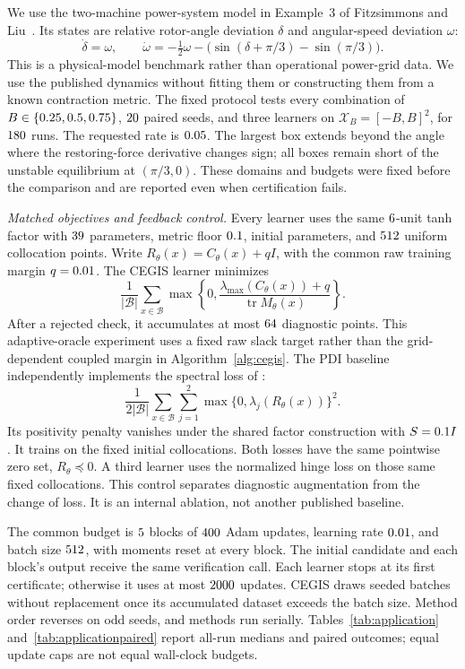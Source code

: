 \documentclass[12pt,onecolumn,journal]{IEEEtran}
\newcommand{\X}{\mathcal{X}}
\newcommand{\lmax}{\lambda_{\max}}
\providecommand{\tr}{}
\renewcommand{\tr}{\operatorname{tr}}
\begin{document}
We use the two-machine power-system model in Example~3 of Fitzsimmons and Liu~\cite{fitzsimmons2024}. Its states are relative rotor-angle deviation $\delta$ and angular-speed deviation $\omega$:
\[
\dot\delta=\omega,\qquad
\dot\omega=-\tfrac12\omega-\bigl(\sin(\delta+\pi/3)-\sin(\pi/3)\bigr).
\]
This is a physical-model benchmark rather than operational power-grid data. We use the published dynamics without fitting them or constructing them from a known contraction metric. The fixed protocol tests every combination of $B\in\{0.25,0.5,0.75\}$, $20$ paired seeds, and three learners on $\X_B=[-B,B]^2$, for $180$ runs. The requested rate is $0.05$. The largest box extends beyond the angle where the restoring-force derivative changes sign; all boxes remain short of the unstable equilibrium at $(\pi/3,0)$. These domains and budgets were fixed before the comparison and are reported even when certification fails.

\noindent\textit{Matched objectives and feedback control.}
Every learner uses the same $6$-unit tanh factor with $39$ parameters, metric floor $0.1$, initial parameters, and $512$ uniform collocation points. Write $R_\theta(x)=C_\theta(x)+qI$, with the common raw training margin $q=0.01$. The CEGIS learner minimizes
\[
\frac1{|\mathcal B|}\sum_{x\in\mathcal B}
\max\left\{0,\frac{\lmax(C_\theta(x))+q}{\tr M_\theta(x)}\right\}.
\]
After a rejected check, it accumulates at most $64$ diagnostic points. This adaptive-oracle experiment uses a fixed raw slack target rather than the grid-dependent coupled margin in Algorithm~\ref{alg:cegis}. The PDI baseline independently implements the spectral loss of \cite[Eq.~(5)]{fitzsimmons2024}:
\[
\frac1{2|\mathcal B|}\sum_{x\in\mathcal B}\sum_{j=1}^2
\max\{0,\lambda_j(R_\theta(x))\}^2.
\]
Its positivity penalty vanishes under the shared factor construction with $S=0.1 I$. It trains on the fixed initial collocations. Both losses have the same pointwise zero set, $R_\theta\preceq0$. A third learner uses the normalized hinge loss on those same fixed collocations. This control separates diagnostic augmentation from the change of loss. It is an internal ablation, not another published baseline.

The common budget is $5$ blocks of $400$ Adam updates, learning rate $0.01$, and batch size $512$, with moments reset at every block. The initial candidate and each block's output receive the same verification call. Each learner stops at its first certificate; otherwise it uses at most $2000$ updates. CEGIS draws seeded batches without replacement once its accumulated dataset exceeds the batch size. Method order reverses on odd seeds, and methods run serially. Tables~\ref{tab:application} and~\ref{tab:applicationpaired} report all-run medians and paired outcomes; equal update caps are not equal wall-clock budgets.
\end{document}
